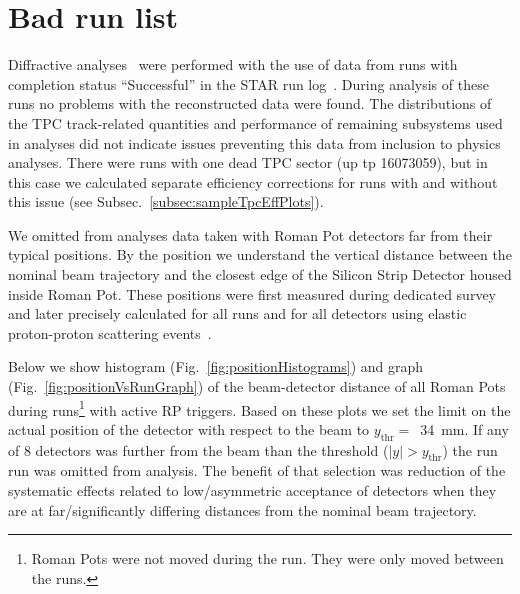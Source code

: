 

\chapter{Bad run list}\label{chap:badRunList}

Diffractive analyses~\cite{AnalysisNoteRafal,AnalysisNoteLukasz} were performed with the use of data from runs with completion status ``Successful'' in the STAR run log~\cite{RunLog}. During analysis of these runs no problems with the reconstructed data were found. The distributions of the TPC track-related quantities and performance of remaining subsystems used in analyses did not indicate issues preventing this data from inclusion to physics analyses. There were runs with one dead TPC sector (up tp 16073059), but in this case we calculated separate efficiency corrections for runs with and without this issue (see Subsec.~\ref{subsec:sampleTpcEffPlots}).

We omitted from analyses data taken with Roman Pot detectors far from their typical positions. By the position we understand the vertical distance between the nominal beam trajectory and the closest edge of the Silicon Strip Detector housed inside Roman Pot. These positions were first measured during dedicated survey~\cite{surveyNote} and later precisely calculated for all runs and for all detectors using elastic proton-proton scattering events~\cite{alignmentPresentation,alignmentDirectory}.%

Below we show histogram (Fig.~\ref{fig:positionHistograms}) and graph (Fig.~\ref{fig:positionVsRunGraph}) of the beam-detector distance of all Roman Pots during runs\footnote{Roman Pots were not moved during the run. They were only moved between the runs.} with active RP triggers. Based on these plots we set the limit on the actual position of the detector with respect to the beam to $y_{\text{thr}} =$~34~mm. If any of 8 detectors was further from the beam than the threshold ($|y|>y_{\text{thr}}$) the run run was omitted from analysis. The benefit of that selection was reduction of the systematic effects related to low/asymmetric acceptance of detectors when they are at far/significantly differing distances from the nominal beam trajectory.

